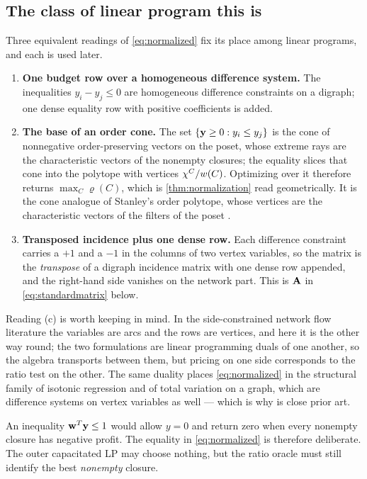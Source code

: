 \subsection{The class of linear program this is}\label{sec:class}
Three equivalent readings of \eqref{eq:normalized} fix its place among linear
programs, and each is used later.
\begin{enumerate}[label=(\alph*),leftmargin=*]
\item \textbf{One budget row over a homogeneous difference system.} The
      inequalities $y_i-y_j\le0$ are homogeneous difference constraints on a
      digraph; one dense equality row with positive coefficients is added.
\item \textbf{The base of an order cone.} The set $\{\mathbf{y}\ge0:y_i\le y_j\}$
      is the cone of nonnegative order-preserving vectors on the poset, whose
      extreme rays are the characteristic vectors of the nonempty closures; the
      equality slices that cone into the polytope with vertices $\chi^C/w(C)$.
      Optimizing over it therefore returns $\max_C\varrho(C)$, which is
      \cref{thm:normalization} read geometrically. It is the cone analogue of
      Stanley's order polytope, whose vertices are the characteristic vectors of
      the filters of the poset \citep{Stanley1986}.
\item \textbf{Transposed incidence plus one dense row.} Each difference
      constraint carries a $+1$ and a $-1$ in the columns of two vertex
      variables, so the matrix is the \emph{transpose} of a digraph incidence
      matrix with one dense row appended, and the right-hand side vanishes on
      the network part. This is $\mathbf{A}$ in \eqref{eq:standardmatrix} below.
\end{enumerate}
Reading (c) is worth keeping in mind. In the side-constrained network flow
literature the variables are arcs and the rows are vertices, and here it is the
other way round; the two formulations are linear programming duals of one
another, so the algebra transports between them, but pricing on one side
corresponds to the ratio test on the other. The same duality places
\eqref{eq:normalized} in the structural family of isotonic regression and of
total variation on a graph, which are difference systems on vertex variables as
well --- which is why \citet{Yang2026} is close prior art.

An inequality $\mathbf{w}^T\mathbf{y}\le1$ would allow $y=0$ and return zero when every
nonempty closure has negative profit. The equality in
\eqref{eq:normalized} is therefore deliberate. The outer capacitated LP
may choose nothing, but the ratio oracle must still identify the best
\emph{nonempty} closure.

